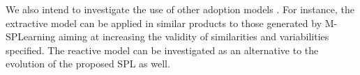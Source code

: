 We also intend to investigate the use of other adoption models \cite{krueger02}. For instance, the extractive model can be applied in similar products to those generated by M-SPLearning aiming at increasing the validity of similarities and variabilities specified. The reactive model can be investigated as an alternative to the evolution of the proposed SPL as well.